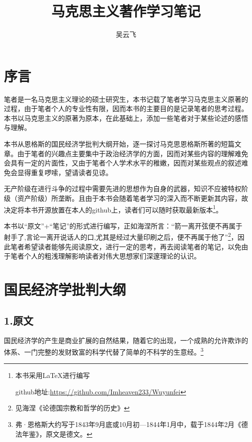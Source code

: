 \documentclass[a4paper,twoside,12pt]{ctexart}
\title{马克思主义著作学习笔记}
\author{吴云飞}
\date{}
\begin{document}
\maketitle

\newpage

\tableofcontents

\newpage

\section{序言}
\begin{adjustwidth}{2em}{2em}
\qquad\fangsong 笔者是一名马克思主义理论的硕士研究生，本书记载了笔者学习马克思主义原著的过程，由于笔者个人的专业性有限，因而本书的主要目的是记录笔者的思考过程。本书以马克思主义的原著为原本，在此基础上，添加一些笔者对于某些论述的感悟与理解。

本书从恩格斯的国民经济学批判大纲开始，逐一探讨马克思恩格斯所著的短篇文章。由于笔者的兴趣点主要集中于政治经济学的方面，因而对某些内容的理解难免会具有一定的片面性，又由于笔者个人学术水平的稚嫩，因而对某些观点的叙述难免会显得重复啰嗦，望请读者见谅。

无产阶级在进行斗争的过程中需要先进的思想作为自身的武器，知识不应被特权阶级（资产阶级）所垄断。且由于本书会随着笔者学习的深入而不断更新其内容，故决定将本书开源放置在本人的github上，读者们可以随时获取最新版本\footnote{本书采用LaTeX进行编写

\quad github地址:\url{https://github.com/Imheaven233/Wuyunfei}}。

本书以“原文”+“笔记”的形式进行编写，正如海涅所言：“箭一离开弦便不再属于射手了,言论一离开说话人的口,尤其是经过大量印刷之后，便不再属于他了”\footnote{见海涅《论德国宗教和哲学的历史》}，因此笔者希望读者能够先阅读原文，进行一定的思考，再去阅读笔者的笔记，以免由于笔者个人的粗浅理解影响读者对伟大思想家们深邃理论的认识。

\end{adjustwidth}

\newpage

\section{国民经济学批判大纲}

\subsection{1.原文}

国民经济学的产生是商业扩展的自然结果，随着它的出现，一个成熟的允许欺诈的体系、一门完整的发财致富的科学代替了简单的不科学的生意经。\footnote{弗·恩格斯大约写于1843年9月底或10月初—1844年1月中，载于1844年2月《德法年鉴》，原文是德文。}
\end{document}
